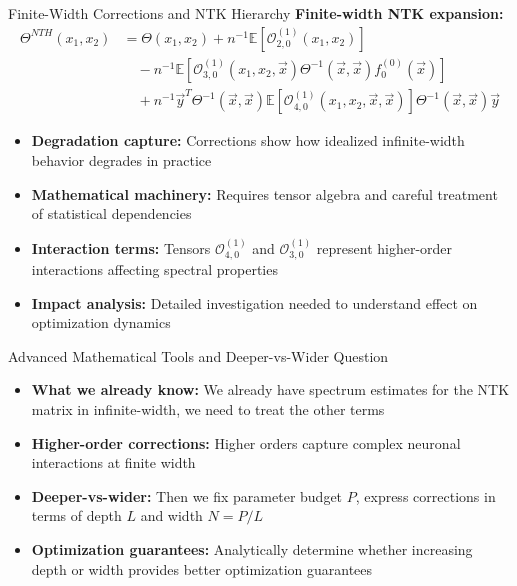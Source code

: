 \documentclass{beamer}
\begin{document}
\begin{frame}{Finite-Width Corrections and NTK Hierarchy}
  \textbf{Finite-width NTK expansion:}
  \begin{align}
  \Theta^{NTH}(x_1, x_2) &= \Theta(x_1, x_2) + n^{-1}\mathbb{E}[\mathcal{O}^{(1)}_{2,0}(x_1, x_2)] \nonumber \\
  &\quad - n^{-1}\mathbb{E}[\mathcal{O}^{(1)}_{3,0}(x_1, x_2, \vec{x})\Theta^{-1}(\vec{x}, \vec{x})f^{(0)}_0(\vec{x})] \nonumber \\
  &\quad + n^{-1}\vec{y}^T \Theta^{-1}(\vec{x}, \vec{x})\mathbb{E}[\mathcal{O}^{(1)}_{4,0}(x_1, x_2, \vec{x}, \vec{x})] \Theta^{-1}(\vec{x}, \vec{x})\vec{y} \nonumber
  \end{align}
  
  \begin{itemize}
  \item \textbf{Degradation capture:} Corrections show how idealized infinite-width behavior degrades in practice
  
  \item \textbf{Mathematical machinery:} Requires tensor algebra and careful treatment of statistical dependencies
  
  \item \textbf{Interaction terms:} Tensors $\mathcal{O}^{(1)}_{4,0}$ and $\mathcal{O}^{(1)}_{3,0}$ represent higher-order interactions affecting spectral properties
  
  \item \textbf{Impact analysis:} Detailed investigation needed to understand effect on optimization dynamics
  \end{itemize}
  \end{frame}



  \begin{frame}{Advanced Mathematical Tools and Deeper-vs-Wider Question}
  \begin{itemize}
  \item \textbf{What we already know:} We already have spectrum estimates for the NTK matrix in infinite-width, we need to treat the other terms
  
  \item \textbf{Higher-order corrections:} Higher orders capture complex neuronal interactions at finite width
  
  \item \textbf{Deeper-vs-wider:} Then we fix parameter budget $P$, express corrections in terms of depth $L$ and width $N = P/L$
  
  \item \textbf{Optimization guarantees:} Analytically determine whether increasing depth or width provides better optimization guarantees
  \end{itemize}
  \end{frame}
  
\end{document}
